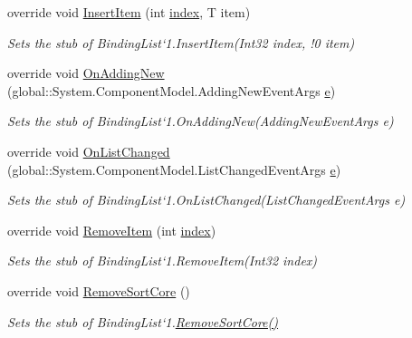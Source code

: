 \begin{DoxyCompactItemize}
override void \hyperlink{class_system_1_1_component_model_1_1_fakes_1_1_stub_binding_list_3_01_t_01_4_a1c4c93a90f4294e06b9651f2c2bef30d}{Insert\-Item} (int \hyperlink{jquery-1_810_82-vsdoc_8js_a75bb12d1f23302a9eea93a6d89d0193e}{index}, T item)
\begin{DoxyCompactList}\small\item\em Sets the stub of Binding\-List`1.Insert\-Item(Int32 index, !0 item)\end{DoxyCompactList}\item 
override void \hyperlink{class_system_1_1_component_model_1_1_fakes_1_1_stub_binding_list_3_01_t_01_4_abd675e5358538946e1b9b90357398d3b}{On\-Adding\-New} (global\-::\-System.\-Component\-Model.\-Adding\-New\-Event\-Args \hyperlink{jquery-1_810_82_8min_8js_a2c038346d47955cbe2cb91e338edd7e1}{e})
\begin{DoxyCompactList}\small\item\em Sets the stub of Binding\-List`1.On\-Adding\-New(\-Adding\-New\-Event\-Args e)\end{DoxyCompactList}\item 
override void \hyperlink{class_system_1_1_component_model_1_1_fakes_1_1_stub_binding_list_3_01_t_01_4_a98d42c63a08979f0cfdc80c81cb12b54}{On\-List\-Changed} (global\-::\-System.\-Component\-Model.\-List\-Changed\-Event\-Args \hyperlink{jquery-1_810_82_8min_8js_a2c038346d47955cbe2cb91e338edd7e1}{e})
\begin{DoxyCompactList}\small\item\em Sets the stub of Binding\-List`1.On\-List\-Changed(\-List\-Changed\-Event\-Args e)\end{DoxyCompactList}\item 
override void \hyperlink{class_system_1_1_component_model_1_1_fakes_1_1_stub_binding_list_3_01_t_01_4_a1d5ea6dad206c2b22557f75b886f6649}{Remove\-Item} (int \hyperlink{jquery-1_810_82-vsdoc_8js_a75bb12d1f23302a9eea93a6d89d0193e}{index})
\begin{DoxyCompactList}\small\item\em Sets the stub of Binding\-List`1.Remove\-Item(\-Int32 index)\end{DoxyCompactList}\item 
override void \hyperlink{class_system_1_1_component_model_1_1_fakes_1_1_stub_binding_list_3_01_t_01_4_a95ed368665465469cde4d803739c355b}{Remove\-Sort\-Core} ()
\begin{DoxyCompactList}\small\item\em Sets the stub of Binding\-List`1.\hyperlink{class_system_1_1_component_model_1_1_fakes_1_1_stub_binding_list_3_01_t_01_4_a95ed368665465469cde4d803739c355b}{Remove\-Sort\-Core()}\end{DoxyCompactList}\item 

\end{DoxyCompactItemize}
